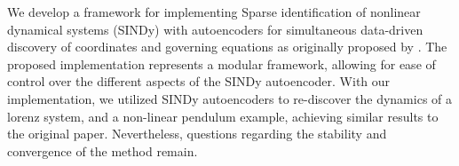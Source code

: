 We develop a framework for implementing Sparse identification of nonlinear dynamical systems (SINDy) with autoencoders for simultaneous data-driven discovery of coordinates and governing equations as originally proposed by \textcite{Champion_2019}. The proposed implementation represents a modular framework, allowing for ease of control over the different aspects of the SINDy autoencoder. With our implementation, we utilized SINDy autoencoders to re-discover the dynamics of a lorenz system, and a non-linear pendulum example, achieving similar results to the original paper. Nevertheless, questions regarding the stability and convergence of the method remain. 